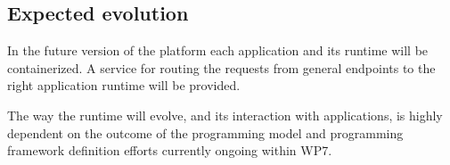 \subsection{Expected evolution}

In the future version of the platform each application and its runtime will be containerized. A service for routing the requests from general endpoints to the right application runtime will be provided.

The way the runtime will evolve, and its interaction with applications, is highly dependent on the outcome of the programming model and programming framework definition efforts currently ongoing within WP7.